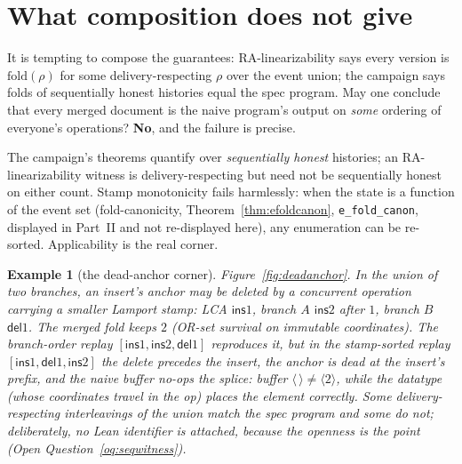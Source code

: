 \documentclass[11pt]{article}
\newtheorem{example}[theorem]{Example}
\newcommand{\lean}[1]{\texttt{#1}}
\newcommand{\del}{\mathsf{del}}
\newcommand{\ins}{\mathsf{ins}}
\begin{document}
\section{What composition does not give}
\label{sec:caveat}

It is tempting to compose the guarantees: RA-linearizability says
every version is $\mathrm{fold}(\rho)$ for some delivery-respecting
$\rho$ over the event union; the campaign says folds of sequentially
honest histories equal the spec program. May one conclude that every
merged document is the naive program's output on \emph{some} ordering
of everyone's operations? \textbf{No}, and the failure is precise.

The campaign's theorems quantify over \emph{sequentially honest}
histories; an RA-linearizability witness is delivery-respecting but
need not be sequentially honest on either count. Stamp monotonicity
fails harmlessly: when the state is a function of the event set
(fold-canonicity, Theorem~\ref{thm:efoldcanon},
\lean{e\_fold\_canon}, displayed in Part~II and not re-displayed
here), any enumeration can be re-sorted. Applicability is the real
corner.

\begin{example}[the dead-anchor corner]
\label{ex:deadanchor}
Figure~\ref{fig:deadanchor}. In the union of two branches, an
insert's anchor may be deleted by a \emph{concurrent} operation
carrying a smaller Lamport stamp: LCA $\ins 1$, branch $A$
$\ins 2$ after $1$, branch $B$ $\del 1$. The merged fold keeps $2$
(OR-set survival on immutable coordinates). The branch-order replay
$[\ins 1, \ins 2, \del 1]$ reproduces it, but in the stamp-sorted
replay $[\ins 1, \del 1, \ins 2]$ the delete precedes the insert, the
anchor is dead at the insert's prefix, and the naive buffer no-ops
the splice: buffer $\langle\,\rangle \ne \langle 2\rangle$, while the
datatype (whose coordinates travel in the op) places the element
correctly. Some delivery-respecting interleavings of the union match
the spec program and some do not; deliberately, no Lean identifier is
attached, because the openness is the point
(Open Question~\ref{oq:seqwitness}).
\end{example}
\end{document}
